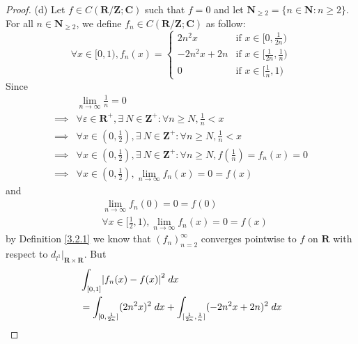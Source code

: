 \begin{proof}{(d)}
    Let \(f \in C(\mathbf{R} / \mathbf{Z} ; \mathbf{C})\) such that \(f = 0\) and let \(\mathbf{N}_{\geq 2} = \{n \in \mathbf{N} : n \geq 2\}\).
    For all \(n \in \mathbf{N}_{\geq 2}\), we define \(f_n \in C(\mathbf{R} / \mathbf{Z} ; \mathbf{C})\) as follow:
    \[
        \forall x \in [0, 1), f_n(x) = \begin{cases}
            2 n^2 x       & \text{if } x \in [0, \frac{1}{2n})           \\
            -2 n^2 x + 2n & \text{if } x \in [\frac{1}{2n}, \frac{1}{n}) \\
            0             & \text{if } x \in [\frac{1}{n}, 1)
        \end{cases}
    \]
    Since
    \begin{align*}
                 & \lim_{n \to \infty} \frac{1}{n} = 0                                                                         \\
        \implies & \forall \varepsilon \in \mathbf{R}^+, \exists\ N \in \mathbf{Z}^+ : \forall n \geq N, \frac{1}{n} < x       \\
        \implies & \forall x \in (0, \frac{1}{2}), \exists\ N \in \mathbf{Z}^+ : \forall n \geq N, \frac{1}{n} < x             \\
        \implies & \forall x \in (0, \frac{1}{2}), \exists\ N \in \mathbf{Z}^+ : \forall n \geq N, f(\frac{1}{n}) = f_n(x) = 0 \\
        \implies & \forall x \in (0, \frac{1}{2}), \lim_{n \to \infty} f_n(x) = 0 = f(x)
    \end{align*}
    and
    \begin{align*}
         & \lim_{n \to \infty} f_n(0) = 0 = f(0)                                 \\
         & \forall x \in [\frac{1}{2}, 1), \lim_{n \to \infty} f_n(x) = 0 = f(x)
    \end{align*}
    by Definition \ref{3.2.1} we know that \((f_n)_{n = 2}^\infty\) converges pointwise to \(f\) on \(\mathbf{R}\) with respect to \(d_{l^1}|_{\mathbf{R} \times \mathbf{R}}\).
    But
    \begin{align*}
         & \int_{[0, 1]} \abs*{f_n(x) - f(x)}^2 \; dx                                                                                                             \\
         & = \int_{[0, \frac{1}{2n}]} (2 n^2 x)^2 \; dx + \int_{[\frac{1}{2n}, \frac{1}{n}]} (-2n^2 x + 2n)^2 \; dx                                               \\

\end{align*}
\end{proof}
